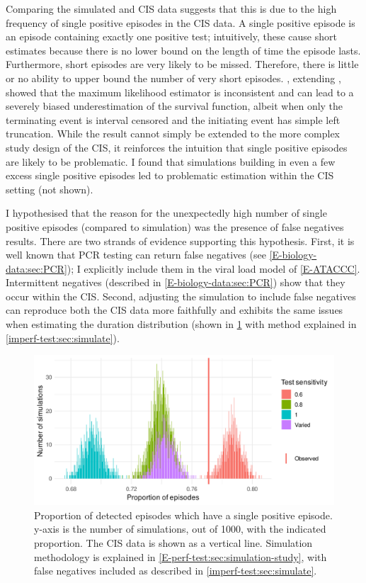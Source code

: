 \documentclass[thesis.tex]{subfiles}
\begin{document}
Comparing the simulated and CIS data suggests that this is due to the high frequency of single positive episodes in the CIS data.
A single positive episode is an episode containing exactly one positive test; intuitively, these cause short estimates because there is no lower bound on the length of time the episode lasts.
Furthermore, short episodes are very likely to be missed.
Therefore, there is little or no ability to upper bound the number of very short episodes.
\Textcite{shenNonparametrica}, extending \textcite{panNote}, showed that the maximum likelihood estimator is inconsistent and can lead to a severely biased underestimation of the survival function, albeit when only the terminating event is interval censored and the initiating event has simple left truncation.
While the result cannot simply be extended to the more complex study design of the CIS, it reinforces the intuition that single positive episodes are likely to be problematic.
I found that simulations building in even a few excess single positive episodes led to problematic estimation within the CIS setting (not shown).

I hypothesised that the reason for the unexpectedly high number of single positive episodes (compared to simulation) was the presence of false negatives results.
There are two strands of evidence supporting this hypothesis.
First, it is well known that PCR testing can return false negatives  (see \cref{E-biology-data:sec:PCR}); I explicitly include them in the viral load model of \cref{E-ATACCC}.
Intermittent negatives (described in  \cref{E-biology-data:sec:PCR}) show that they occur within the CIS.
Second, adjusting the simulation to include false negatives can reproduce both the CIS data more faithfully and exhibits the same issues when estimating the duration distribution (shown in \cref{imperf-test:fig:sim-single-pos} with method explained in \cref{imperf-test:sec:simulate}).
\begin{figure}
  \centering \includegraphics{cis-imperfect-testing/sim-single-positive-episodes}
  \caption[Single positive episodes in CIS simulation]{%
    Proportion of detected episodes which have a single positive episode.
    y-axis is the number of simulations, out of 1000, with the indicated proportion.
    The CIS data is shown as a vertical line.
    Simulation methodology is explained in \cref{E-perf-test:sec:simulation-study}, with false negatives included as described in \cref{imperf-test:sec:simulate}.
  }
  \label{imperf-test:fig:sim-single-pos}
\end{figure}
\end{document}
